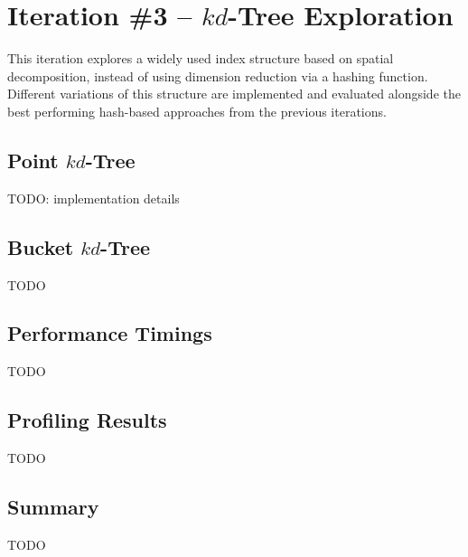 \section{Iteration \#3 -- $kd$-Tree Exploration}

This iteration explores a widely used index structure based on spatial decomposition, instead of using dimension reduction via a hashing function. Different variations of this structure are implemented and evaluated alongside the best performing hash-based approaches from the previous iterations.

\subsection{Point $kd$-Tree}

TODO: implementation details

\subsection{Bucket $kd$-Tree}

TODO

\subsection{Performance Timings}

TODO

\subsection{Profiling Results}

TODO

\subsection{Summary}

TODO